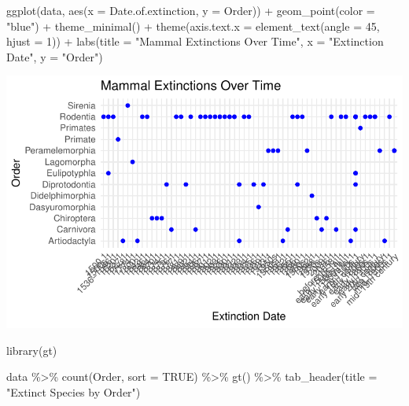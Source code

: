 \documentclass[
  letterpaper,
  DIV=11,
  numbers=noendperiod]{scrartcl}
\newenvironment{Shaded}{\begin{snugshade}}{\end{snugshade}}
\newcommand{\AttributeTok}[1]{\textcolor[rgb]{0.40,0.45,0.13}{#1}}
\newcommand{\ConstantTok}[1]{\textcolor[rgb]{0.56,0.35,0.01}{#1}}
\newcommand{\DecValTok}[1]{\textcolor[rgb]{0.68,0.00,0.00}{#1}}
\newcommand{\FunctionTok}[1]{\textcolor[rgb]{0.28,0.35,0.67}{#1}}
\newcommand{\NormalTok}[1]{\textcolor[rgb]{0.00,0.23,0.31}{#1}}
\newcommand{\SpecialCharTok}[1]{\textcolor[rgb]{0.37,0.37,0.37}{#1}}
\newcommand{\StringTok}[1]{\textcolor[rgb]{0.13,0.47,0.30}{#1}}
\begin{document}
\begin{Shaded}
\begin{Highlighting}[]
\FunctionTok{ggplot}\NormalTok{(data, }\FunctionTok{aes}\NormalTok{(}\AttributeTok{x =}\NormalTok{ Date.of.extinction, }\AttributeTok{y =}\NormalTok{ Order)) }\SpecialCharTok{+}
  \FunctionTok{geom\_point}\NormalTok{(}\AttributeTok{color =} \StringTok{"blue"}\NormalTok{) }\SpecialCharTok{+}
  \FunctionTok{theme\_minimal}\NormalTok{() }\SpecialCharTok{+}
  \FunctionTok{theme}\NormalTok{(}\AttributeTok{axis.text.x =} \FunctionTok{element\_text}\NormalTok{(}\AttributeTok{angle =} \DecValTok{45}\NormalTok{, }\AttributeTok{hjust =} \DecValTok{1}\NormalTok{)) }\SpecialCharTok{+}
  \FunctionTok{labs}\NormalTok{(}\AttributeTok{title =} \StringTok{"Mammal Extinctions Over Time"}\NormalTok{, }\AttributeTok{x =} \StringTok{"Extinction Date"}\NormalTok{, }\AttributeTok{y =} \StringTok{"Order"}\NormalTok{)}
\end{Highlighting}
\end{Shaded}

\includegraphics{Extinct-species-by-region-_files/figure-pdf/unnamed-chunk-3-1.pdf}

\begin{Shaded}
\begin{Highlighting}[]
\FunctionTok{library}\NormalTok{(gt)}

\NormalTok{data }\SpecialCharTok{\%\textgreater{}\%}
  \FunctionTok{count}\NormalTok{(Order, }\AttributeTok{sort =} \ConstantTok{TRUE}\NormalTok{) }\SpecialCharTok{\%\textgreater{}\%}
  \FunctionTok{gt}\NormalTok{() }\SpecialCharTok{\%\textgreater{}\%}
  \FunctionTok{tab\_header}\NormalTok{(}\AttributeTok{title =} \StringTok{"Extinct Species by Order"}\NormalTok{)}
\end{Highlighting}
\end{Shaded}
\end{document}
